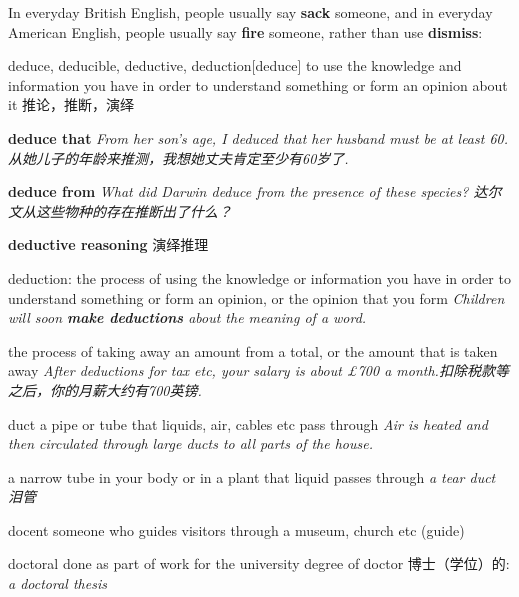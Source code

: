 \begin{remark}
    In everyday British English, people usually say \textbf{sack} someone, and in everyday American English, people usually say \textbf{fire} someone, rather than use \textbf{dismiss}:
\end{remark}

\begin{DefWord}{deduce, deducible, deductive, deduction}[deduce]
    to use the knowledge and information you have in order to understand something or form an opinion about it 推论，推断，演绎

    \textbf{deduce that}
    \textit{From her son's age, I deduced that her husband must be at least 60. 从她儿子的年龄来推测，我想她丈夫肯定至少有60岁了. }

    \textbf{deduce from}
    \textit{What did Darwin deduce from the presence of these species? 达尔文从这些物种的存在推断出了什么？}

    \textbf{deductive reasoning} 演绎推理

    deduction: the process of using the knowledge or information you have in order to understand something or form an opinion, or the opinion that you form
    \textit{Children will soon \textbf{make deductions} about the meaning of a word.}

    the process of taking away an amount from a total, or the amount that is taken away
    \textit{After deductions for tax etc, your salary is about £700 a month.扣除税款等之后，你的月薪大约有700英镑. }
\end{DefWord}

\begin{DefWord}{duct}
    a pipe or tube that liquids, air, cables etc pass through
    \textit{Air is heated and then circulated through large ducts to all parts of the house.}

    a narrow tube in your body or in a plant that liquid passes through
    \textit{a tear duct 泪管}
\end{DefWord}

\begin{DefWord}{docent}
    someone who guides visitors through a museum, church etc (guide)
\end{DefWord}

\begin{DefWord}{doctoral}
    done as part of work for the university degree of doctor
    博士（学位）的:
    \textit{a doctoral thesis}
\end{DefWord}

